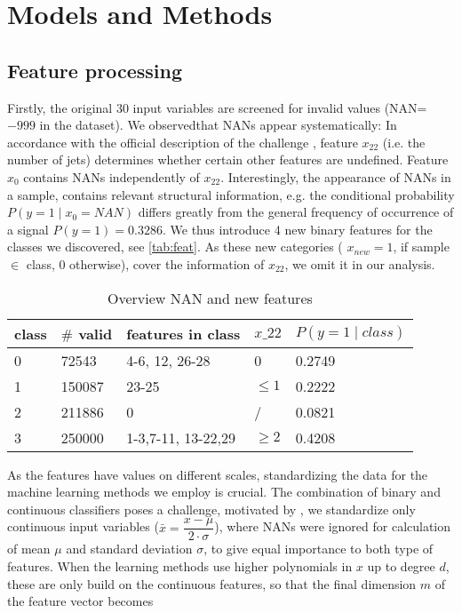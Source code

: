 \section{Models and Methods}

\subsection{Feature processing}
Firstly, the original 30 input variables are screened for invalid values (NAN=$-999$ in the dataset). We observedthat NANs appear systematically: In accordance with the official description of the challenge \cite{documentation}, feature $x_{22}$  (i.e. the number of jets) determines whether certain other features are undefined. Feature $x_0$  contains NANs independently of $x_{22}$. Interestingly, the appearance of NANs in a sample, contains relevant structural information, e.g.  the conditional probability $P(y=1\mid x_0=\textit{NAN})$ differs greatly from the general frequency of occurrence of a signal $P(y=1)=0.3286$. We thus introduce 4 new binary features for the classes we discovered, see \autoref{tab:feat}. As these new categories ( $x_\textit{new}=1$, if sample $\in$ class, 0 otherwise), cover the information of $x_{22}$, we omit it in our analysis. 
\begin{table}[]
\centering
\begin{tabular}{l|l|l|l|l}
class & $\#$ valid & features in class         & $x\_22$      & $P(y=1 \mid class)$ \\ \hline
0     & 72543    & 4-6, 12, 26-28     & 0           &                 
0.2749
 \\ \hline
1     & 150087   & 23-25              & $\leq1$ &                 0.2222
 \\ \hline
2     & 211886   & 0                  & / &                 0.0821
 \\ \hline
3     & 250000   & 1-3,7-11, 13-22,29 & $\geq 2  $      &                 0.4208 
\end{tabular}
\caption{Overview NAN and new features}
\label{tab:feat}
\end{table}
As the features have values on different scales, standardizing the data for the machine learning methods we employ is crucial. The combination of binary and continuous classifiers poses a challenge, motivated by \cite{2sigma}, we standardize only continuous input variables ($ \bar{x}=\dfrac{x-\mu}{2 \cdot\sigma}$), where NANs were ignored for calculation of mean $\mu$ and standard deviation $\sigma$, to give equal importance to both type of features. When  the learning methods use  higher polynomials in $x$ up to degree $d$, these are only build on the continuous features, so that the final dimension $m$ of the feature vector becomes
